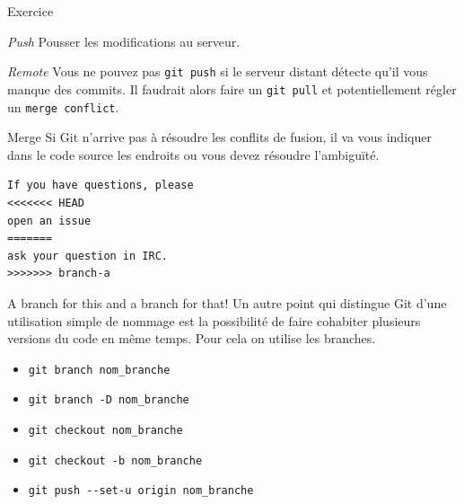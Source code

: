\documentclass[11pt]{beamer}
\begin{document}
\begin{frame}[fragile]{Exercice}
	\begin{block}{\textit{Push}}
		Pousser les modifications au serveur. \\
	\end{block}
\end{frame}

\begin{frame}[fragile]{\textit{Remote}}
	Vous ne pouvez pas \verb|git push| si le serveur distant détecte qu'il vous manque des commits. Il faudrait alors faire un \verb|git pull| et potentiellement régler un \verb|merge conflict|.
\end{frame}

\begin{frame}[fragile]{Merge}
Si Git n'arrive pas à résoudre les conflits de fusion, il va vous indiquer dans le code source les endroits ou vous devez résoudre l'ambiguïté.
\begin{block}{}
\begin{lstlisting}
If you have questions, please
<<<<<<< HEAD
open an issue
=======
ask your question in IRC.
>>>>>>> branch-a
\end{lstlisting}
\end{block}
\end{frame}

\begin{frame}[fragile]{A branch for this and a branch for that!}
Un autre point qui distingue Git d'une utilisation simple de nommage est la possibilité de faire cohabiter plusieurs versions du code en même temps. Pour cela on utilise les branches.
	
	\begin{itemize}[<+->]
		\item \verb|git branch nom_branche|
		\item \verb|git branch -D nom_branche|
		\item \verb|git checkout nom_branche|
		\item \verb|git checkout -b nom_branche|
		\item \verb|git push --set-u origin nom_branche|
	\end{itemize}
\end{frame}
\end{document}
